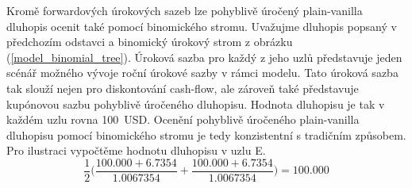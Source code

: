 \documentclass[a4paper]{book}
\begin{document}
Kromě forwardových úrokových sazeb lze pohyblivě úročený plain-vanilla dluhopis ocenit také pomocí binomického stromu. Uvažujme dluhopis popsaný v předchozím odstavci a binomický úrokový strom z obrázku (\ref{model_binomial_tree}). Úroková sazba pro každý z jeho uzlů představuje jeden scénář možného vývoje roční úrokové sazby v rámci modelu. Tato úroková sazba tak slouží nejen pro diskontování cash-flow, ale zároveň také představuje kupónovou sazbu pohyblivě úročeného dluhopisu. Hodnota dluhopisu je tak v každém uzlu rovna 100~USD. Ocenění pohyblivě úročeného plain-vanilla dluhopisu pomocí binomického stromu je tedy konzistentní s tradičním způsobem. Pro ilustraci vypočtěme hodnotu dluhopisu v uzlu E.
\begin{equation*}
\frac{1}{2}\Bigg( \frac{100.000 + 6.7354}{1.0067354}  + \frac{100.000 + 6.7354}{1.0067354} \Bigg) = 100.000
\end{equation*}
\end{document}
